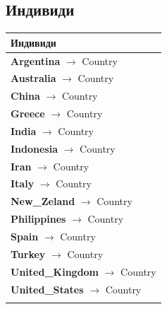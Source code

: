 \documentclass[12pt]{article}
\begin{document}
    
    
    
    \subsection{Индивиди}
    
        \begin{tabularx}{1\textwidth}{@{}X@{}}
        \toprule
        \textbf{Индивиди} \\
        \midrule
        \endhead

            \textbf{Argentina} $\rightarrow$ Country \\
            \textbf{Australia} $\rightarrow$ Country \\
            \textbf{China} $\rightarrow$ Country \\
            \textbf{Greece} $\rightarrow$ Country \\
            \textbf{India} $\rightarrow$ Country \\
            \textbf{Indonesia} $\rightarrow$ Country \\
            \textbf{Iran} $\rightarrow$ Country \\
            \textbf{Italy} $\rightarrow$ Country \\
            \textbf{New\_Zeland} $\rightarrow$ Country \\
            \textbf{Philippines} $\rightarrow$ Country \\
            \textbf{Spain} $\rightarrow$ Country \\
            \textbf{Turkey} $\rightarrow$ Country \\
            \textbf{United\_Kingdom} $\rightarrow$ Country \\
            \textbf{United\_States} $\rightarrow$ Country \\
            \tabularnewline


\end{tabularx}
\end{document}
